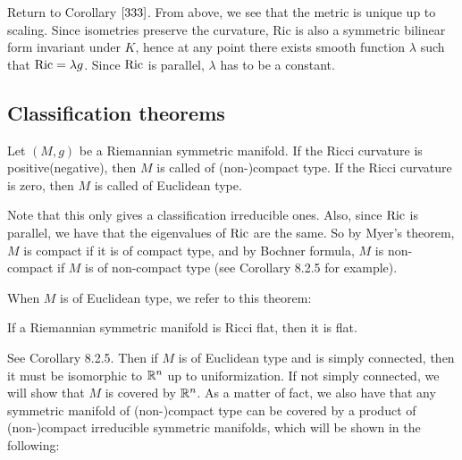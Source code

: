 \bproof
Return to Corollary $\ref{333}$. From above, we see that the
metric is unique up to scaling. Since isometries preserve the
curvature, Ric is also a symmetric bilinear form invariant under
$K$, hence at any point there exists smooth function $\lambda$
such that $\mathrm{Ric} = \lambda g$. Since $\mathrm{Ric} $ is parallel,
$\lambda$ has to be a constant.
\eproof
\subsection{Classification theorems}
\begin{definition}
	Let $(M,g)$ be a Riemannian symmetric manifold. If the Ricci
	curvature is positive(negative), then $M$ is called of
	(non-)compact type. If the Ricci curvature is zero, then $M$
	is called of Euclidean type.
\end{definition}

\bremark
Note that this only gives a classification irreducible ones.
Also, since $\mathrm{Ric}$ is parallel, we have that the eigenvalues of
$\mathrm{Ric}$ are the same. So by Myer's theorem, $M$ is compact if it
is of compact type, and by Bochner formula, $M$ is non-compact
if $M$ is of non-compact type (see \cite{Peter} Corollary 8.2.5
for example).

\eremark

When $M$ is of Euclidean type, we refer to this theorem:
\begin{theorem}
	If a Riemannian symmetric manifold is Ricci flat, then it is
	flat.
\end{theorem}
\bproof
See \cite{Peter} Corollary 8.2.5.
\eproof
 Then if $M$ is of Euclidean type and  is simply connected, then
 it must be isomorphic to ${\mathbb R}^n$ up to uniformization. If not
 simply connected, we will show that $M$ is covered by ${\mathbb R}^n$.
 As a matter of fact, we also have that any symmetric manifold
 of (non-)compact type can be covered by a product of
 (non-)compact irreducible symmetric manifolds, which will be
 shown in the following:
 
